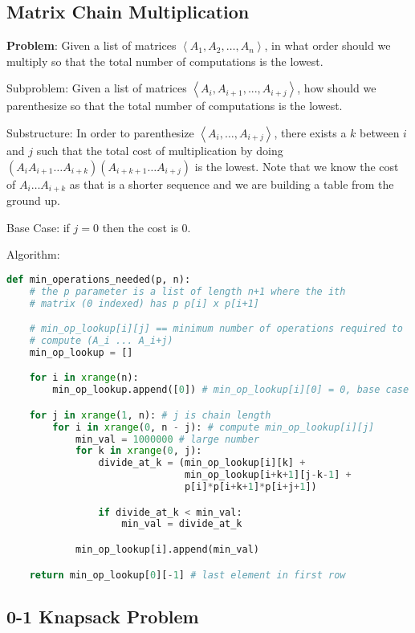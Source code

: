 \documentclass[12 pt, twoside] {article}
\begin{document}
{\subsection*{Matrix Chain Multiplication}

\textbf{Problem}: Given a list of matrices $\left<A_1, A_2, \dots, A_n\right>$,
in what order should we multiply so that the total number of computations is the
lowest.

Subproblem: Given a list of matrices $\left<A_i, A_{i + 1}, ..., A_{i + j}\right>$,
how should we parenthesize so that the total number of computations is the
lowest.

Substructure: In order to parenthesize $\left<A_i, \dots, A_{i+j}\right>$, there
exists a $k$ between $i$ and $j$ such that the total cost of multiplication by
doing $(A_iA_{i+1}\dots A_{i+k})(A_{i+k+1}\dots A_{i+j})$ is the lowest. Note
that we know the cost of $A_i\dots A_{i+k}$ as that is a shorter sequence and we are
building a table from the ground up.

Base Case: if $j = 0$ then the cost is 0.

Algorithm:
\begin{lstlisting}[language=python]
def min_operations_needed(p, n):
    # the p parameter is a list of length n+1 where the ith
    # matrix (0 indexed) has p p[i] x p[i+1]

    # min_op_lookup[i][j] == minimum number of operations required to
    # compute (A_i ... A_i+j)
    min_op_lookup = []

    for i in xrange(n):
        min_op_lookup.append([0]) # min_op_lookup[i][0] = 0, base case

    for j in xrange(1, n): # j is chain length
        for i in xrange(0, n - j): # compute min_op_lookup[i][j]
            min_val = 1000000 # large number
            for k in xrange(0, j):
                divide_at_k = (min_op_lookup[i][k] +
                               min_op_lookup[i+k+1][j-k-1] +
                               p[i]*p[i+k+1]*p[i+j+1])

                if divide_at_k < min_val:
                    min_val = divide_at_k

            min_op_lookup[i].append(min_val)

    return min_op_lookup[0][-1] # last element in first row
\end{lstlisting}

\subsection*{0-1 Knapsack Problem}

}
\end{document}
